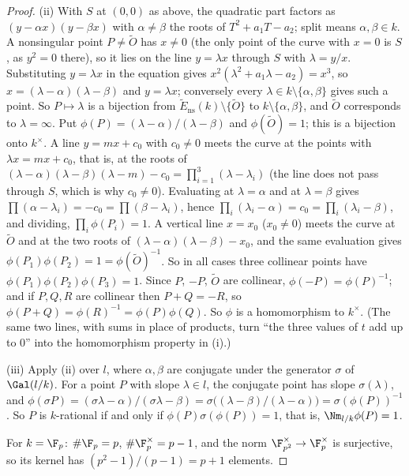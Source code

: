 \begin{proof}
(ii) With $S$ at $(0,0)$ as above, the quadratic part factors as $(y-\alpha x)(y-\beta x)$ with $\alpha\ne\beta$ the roots of
$T^2+a_1T-a_2$; split means $\alpha,\beta\in k$. A nonsingular point $P\ne\tilde O$ has $x\ne0$ (the only point of the curve
with $x=0$ is $S$, as $y^2=0$ there), so it lies on the line $y=\lambda x$ through $S$ with $\lambda=y/x$. Substituting
$y=\lambda x$ in the equation gives $x^2(\lambda^2+a_1\lambda-a_2)=x^3$, so $x=(\lambda-\alpha)(\lambda-\beta)$ and $y=\lambda x$;
conversely every $\lambda\in k\setminus\{\alpha,\beta\}$ gives such a point. So $P\mapsto\lambda$ is a bijection from
$\tilde E_{\mathrm{ns}}(k)\setminus\{\tilde O\}$ to $k\setminus\{\alpha,\beta\}$, and $\tilde O$ corresponds to
$\lambda=\infty$. Put $\phi(P)=(\lambda-\alpha)/(\lambda-\beta)$ and $\phi(\tilde O)=1$; this is a bijection onto
$k^\times$. A line $y=mx+c_0$ with $c_0\ne0$ meets the curve at the points with $\lambda x=mx+c_0$, that is, at the
roots of $(\lambda-\alpha)(\lambda-\beta)(\lambda-m)-c_0=\prod_{i=1}^3(\lambda-\lambda_i)$ (the line does not pass through
$S$, which is why $c_0\ne0$). Evaluating at $\lambda=\alpha$ and at $\lambda=\beta$ gives $\prod(\alpha-\lambda_i)=-c_0=\prod(\beta-\lambda_i)$,
hence $\prod_i(\lambda_i-\alpha)=c_0=\prod_i(\lambda_i-\beta)$, and dividing, $\prod_i\phi(P_i)=1$. A vertical line
$x=x_0$ ($x_0\ne0$) meets the curve at $\tilde O$ and at the two roots of $(\lambda-\alpha)(\lambda-\beta)-x_0$, and the same
evaluation gives $\phi(P_1)\phi(P_2)=1=\phi(\tilde O)^{-1}$. So in all cases three collinear points have
$\phi(P_1)\phi(P_2)\phi(P_3)=1$. Since $P$, $-P$, $\tilde O$ are collinear, $\phi(-P)=\phi(P)^{-1}$; and if $P,Q,R$ are collinear then
$P+Q=-R$, so $\phi(P+Q)=\phi(R)^{-1}=\phi(P)\phi(Q)$. So $\phi$ is a homomorphism to $k^\times$. (The same two lines, with sums in
place of products, turn ``the three values of $t$ add up to $0$'' into the homomorphism property in (i).)

(iii) Apply (ii) over $l$, where $\alpha,\beta$ are conjugate under the generator $\sigma$ of $\Gal(l/k)$. For a point
$P$ with slope $\lambda\in l$, the conjugate point has slope $\sigma(\lambda)$, and
$\phi(\sigma P)=(\sigma\lambda-\alpha)/(\sigma\lambda-\beta)=\sigma\bigl((\lambda-\beta)/(\lambda-\alpha)\bigr)=\sigma(\phi(P))^{-1}$. So $P$
is $k$-rational if and only if $\phi(P)\sigma(\phi(P))=1$, that is, $\Nm_{l/k}\phi(P)=1$.

For $k=\F_p$: $\#\F_p=p$, $\#\F_p^\times=p-1$, and the norm $\F_{p^2}^\times\to\F_p^\times$ is surjective, so its
kernel has $(p^2-1)/(p-1)=p+1$ elements.
\end{proof}

